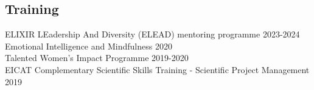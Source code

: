 \documentclass[margin,line]{res}
\begin{document}
\begin{resume}


\section{\sc Training}

ELIXIR LEadership And Diversity (ELEAD) mentoring programme \hfill {2023-2024}\\
Emotional Intelligence and Mindfulness \hfill {2020}\\
Talented Women's Impact Programme \hfill {2019-2020}\\
EICAT Complementary Scientific Skills Training - Scientific Project Management \hfill {2019}\\

\end{resume}
\end{document}
